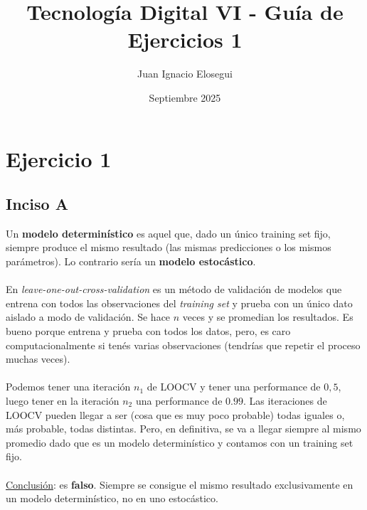 \documentclass{article}
\title{Tecnología Digital VI - Guía de Ejercicios 1}
\author{Juan Ignacio Elosegui}
\date{Septiembre 2025}
\begin{document}
    \maketitle
    \section*{Ejercicio 1}
        \subsection*{Inciso A}
            Un \textbf{modelo determinístico} es aquel que, dado un único training set fijo, siempre produce el mismo resultado (las mismas predicciones o los mismos parámetros). Lo contrario sería un \textbf{modelo estocástico}.\\
            \\
            En \textit{leave-one-out-cross-validation} es un método de validación de modelos que entrena con todos las observaciones del \textit{training set} y prueba con un único dato aislado a modo de validación. Se hace $n$ veces y se promedian los resultados. Es bueno porque entrena y prueba con todos los datos, pero, es caro computacionalmente si tenés varias observaciones (tendrías que repetir el proceso muchas veces). \\
            \\
            Podemos tener una iteración $n_{1}$ de LOOCV y tener una performance de $0,5$, luego tener en la iteración $n_{2}$ una performance de $0.99$. Las iteraciones de LOOCV pueden llegar a ser (cosa que es muy poco probable) todas iguales o, más probable, todas distintas. Pero, en definitiva, se va a llegar siempre al mismo promedio dado que es un modelo determinístico y contamos con un training set fijo. \\
            \\
            \underline{Conclusión}: es \textbf{falso}. Siempre se consigue el mismo resultado exclusivamente en un modelo determinístico, no en uno estocástico.
\end{document}
